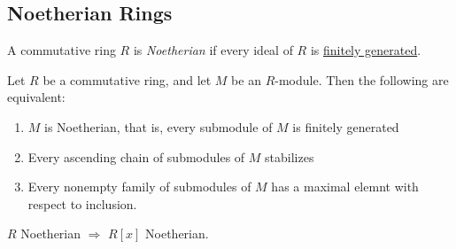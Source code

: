 \subsection{Noetherian Rings}\label{noetherian rings}
A commutative ring $R$ is \emph{Noetherian} if every ideal of $R$ is \hyperref[finitelygenerated]{finitely generated}.

\begin{proposition}
Let $R$ be a commutative ring, and let $M$ be an $R$-module. Then the following are equivalent:
\begin{enumerate}
  \item $M$ is Noetherian, that is, every submodule of $M$ is finitely generated
  \item Every ascending chain of submodules of $M$ stabilizes
  \item Every nonempty family of submodules of $M$ has a maximal elemnt with respect to inclusion.
\end{enumerate}
\end{proposition}

\begin{lemma}
\label{hilbertsbasisthm}
$R$ Noetherian $\Rightarrow$ $R[x]$ Noetherian.
\end{lemma}

